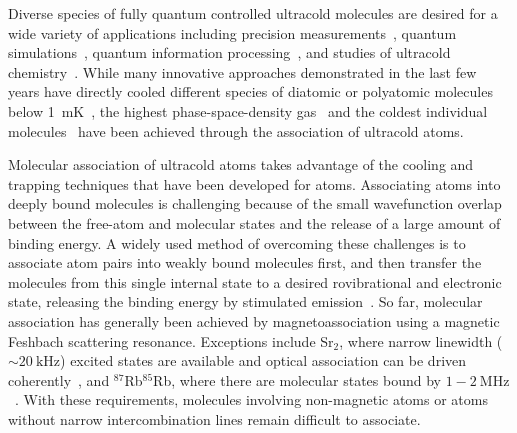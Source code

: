 \documentclass[aps,prl,twocolumn,10pt,superscriptaddress]{revtex4-1}
\begin{document}
Diverse species of fully quantum controlled  ultracold molecules are desired
for a wide variety of applications including precision measurements~\cite{
  Kondov2019,Nick_and_Ivan2017, PhysRevA.101.042504, Andreev2018,
  PhysRevLett.119.153001, hudson2011},
quantum simulations~\cite{Micheli2006, Yao2018, Wall2015, wall2015realizing},
quantum information processing~\cite{DeMille2002, Ni2018, Hudson2018, Lin2019},
and studies of ultracold chemistry~\cite{Bala2016,Hu1111,Segev2019,deJongh626}.
While many innovative approaches demonstrated in the last few years
have directly cooled different species of diatomic or polyatomic molecules
below 1~mK~\cite{Norrgard2016,Anderegg2018, Mitra1366, PhysRevX.10.021049,
  PhysRevLett.121.013202, Truppe2017},
the highest phase-space-density gas~\cite{Demarco2018} and
the coldest individual molecules~\cite{Zhang2020,He331}
have been achieved through the association of ultracold atoms.

Molecular association of ultracold atoms takes advantage of the cooling and trapping techniques
that have been developed for atoms.
Associating atoms into deeply bound molecules is challenging
because of the small wavefunction overlap between the free-atom and molecular states
and the release of a large amount of binding energy.
A widely used method of overcoming these challenges is to associate atom pairs
into weakly bound molecules first,
and then transfer the molecules from this single internal state
to a desired rovibrational and electronic state,
releasing the binding energy by stimulated emission~\cite{Danzl2008, Ni2008, Lang2008,
  Takekoshi2014, Molony2014, Park2015, Guo2016, Kondov2019, Voges2020}.
So far, molecular association has generally been achieved by magnetoassociation
using a magnetic Feshbach scattering resonance.
Exceptions include Sr$_2$, where narrow linewidth ($\sim 20~\mathrm{kHz}$) excited states
are available and optical association can be driven coherently~\cite{Reinaudi2012,Stellmer2012},
and $^{87}$Rb$^{85}$Rb,
where there are molecular states bound by $1-2~\mathrm{MHz}$~\cite{He331}.
With these requirements, molecules involving non-magnetic atoms
or atoms without narrow intercombination lines remain difficult to associate.
\end{document}
